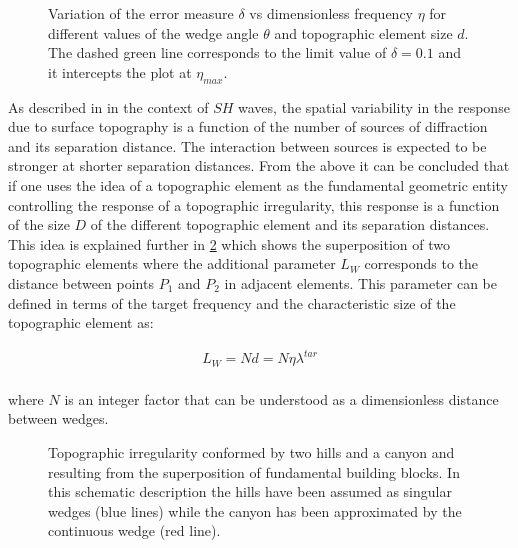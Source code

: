 \documentclass[11pt,letterpaper]{article}
\begin{document}
\begin{figure}[H]
	\centering
	\caption{\small Variation of the error measure $\delta$ vs dimensionless frequency $\eta$ for different values of the wedge angle $\theta$ and topographic element size $d$. The dashed green line corresponds to the limit value of $\delta = 0.1$ and it intercepts the plot at $\eta_{max}$.} 
	\label{fig:wedge}
\end{figure}

As described in \cite{Jaramillo2012Analytic} in the context  of $SH$ waves, the spatial variability in the response due to surface topography is a function of the number of sources of diffraction and its separation distance. The interaction between sources is expected to be stronger at shorter separation distances. From the above it can be concluded that if one uses the idea of a topographic element as the fundamental geometric entity controlling the response of a topographic irregularity, this response is a function of the size $D$ of the different topographic element and its separation distances. This idea is explained further in \cref{fig:superpo} which shows the superposition of two topographic elements where the additional parameter $L_W$ corresponds to the distance between points $P_1$ and $P_2$ in adjacent elements. This parameter can be defined in terms of the target frequency and the characteristic size of the topographic element as:

\begin{equation}
\begin{split}
L_W= Nd = N  \eta {\lambda ^ {tar}}   \\
\label{Eq:dist}
\end{split}
\end{equation}

where $N$ is an integer factor that can be understood as a dimensionless distance between wedges.

\begin{figure}[H]
	\centering
	\caption{\small Topographic irregularity conformed by two hills and a canyon and resulting from the superposition of fundamental building blocks. In this schematic description the hills have been assumed as singular wedges (blue lines) while the canyon has been approximated by the continuous wedge (red line).} 
	\label{fig:superpo}
\end{figure}
\end{document}
